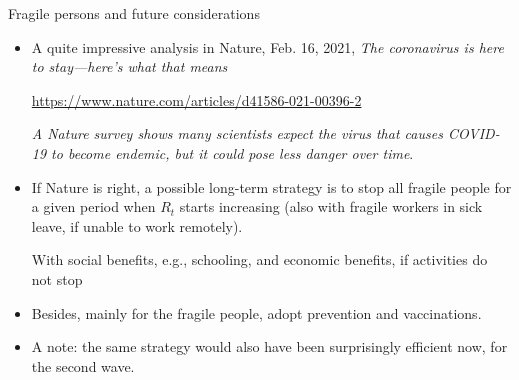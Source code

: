 \documentclass[8pt]{beamer}
\begin{document}
\begin{frame}{Fragile persons and future considerations}

\begin{itemize}

\item A quite impressive analysis  in Nature, Feb. 16, 2021, 
\emph{The coronavirus is here to stay---here's what that means}

\medskip

\url{https://www.nature.com/articles/d41586-021-00396-2}

\medskip

\emph{A Nature survey shows many scientists expect the virus that causes COVID-19 to become endemic, but it could pose less danger over time}.

\medskip

\item
If Nature is right, a possible long-term strategy is to stop all fragile people for a given period when $R_t$ starts increasing (also with fragile workers in sick leave, if unable to work remotely).

\medskip

With social benefits, e.g., schooling, and economic benefits, if activities do not stop

\medskip

\item Besides, mainly for the fragile people, adopt prevention and vaccinations.

\medskip

\item A note: the same strategy would also have been surprisingly efficient now, for the second wave.

\end{itemize}

\end{frame}
\end{document}
